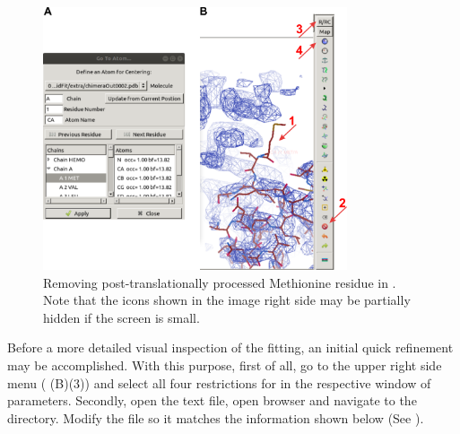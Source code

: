   \begin{figure}[H]
  \centering 
  \captionsetup{width=.7\linewidth} 
  \includegraphics[width=0.80\textwidth]{Images/Fig27}
  \caption{Removing post-translationally processed Methionine residue in \coot. Note that the icons shown in the image right side may be partially hidden if the screen is small.}
  \label{fig:coot_go_to_atom}
  \end{figure}
  
  Before a more detailed visual inspection of the  fitting, an initial quick refinement may be accomplished. With this purpose, first of all, go to the upper right side menu ( (B)(3)) and select all four restrictions for  in the respective window of parameters. Secondly, open the  text file, 
  open \scipion browser and navigate to the  directory. Modify the file so it matches the information shown below (See ).\\
  \ttt{[myvars]}\\
  \\
  \\
  \\
  \\
  \\
  

